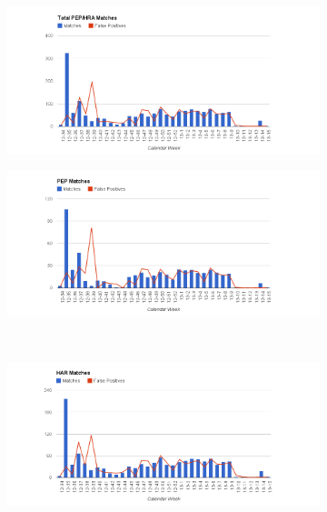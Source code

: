 \documentclass[a4paper, oneside]{csthesis}
\begin{document}
\begin{figure}
        \centering
        \begin{subfigure}[b]{\textwidth}
                \centering
                \includegraphics[width=\textwidth]{figures/chart_total.png}
                \label{fig:chart-total}
        \end{subfigure}%

        \begin{subfigure}[b]{\textwidth}
                \centering
                \includegraphics[width=\textwidth]{figures/chart_pep.png}
                \label{fig:chart-pep}
        \end{subfigure}%

        ~ %
        \begin{subfigure}[b]{\textwidth}
                \centering
                \includegraphics[width=\textwidth]{figures/chart_har.png}
                \label{fig:chart-har}
        \end{subfigure}%


\end{figure}
\end{document}
